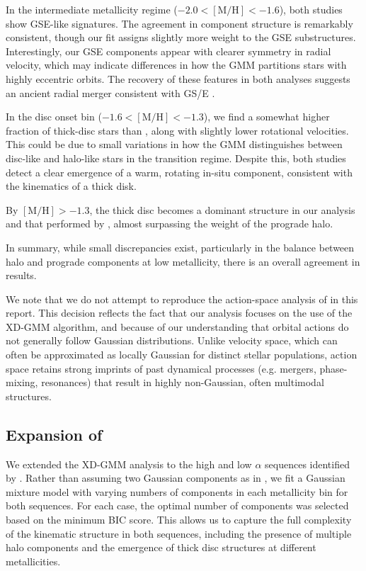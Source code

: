 \documentclass[a4paper,12pt]{article}
\begin{document}
In the intermediate metallicity regime ($-2.0 < \mathrm{[M/H]} < -1.6$), both studies show GSE-like 
signatures. The agreement in component structure is remarkably consistent, though our fit assigns slightly 
more weight to the GSE substructures. Interestingly, our GSE components appear with clearer symmetry in radial 
velocity, which may indicate differences in how the GMM partitions stars with highly eccentric orbits. 
The recovery of these features in both analyses suggests an ancient radial merger consistent with GS/E \citep{Belokurov2020}.

In the disc onset bin ($-1.6 < \mathrm{[M/H]} < -1.3$), we find a somewhat higher fraction of 
thick-disc stars than \citet{zhang2024existencemetalpoordiscmilky}, along with slightly lower rotational 
velocities. This could be due to small variations in how the GMM distinguishes between disc-like and 
halo-like stars in the transition regime. Despite this, both studies detect a clear emergence of a warm, 
rotating in-situ component, consistent with the kinematics of a thick disk.

By $[\mathrm{M/H}] > -1.3$, the thick disc becomes a dominant structure in our analysis and that performed
by \citet{zhang2024existencemetalpoordiscmilky}, almost surpassing the weight of the prograde halo.

In summary, while small discrepancies exist, particularly in the balance between halo and prograde components 
at low metallicity, there is an overall agreement in results.

We note that we do not attempt to reproduce the action-space analysis of \citet{zhang2024existencemetalpoordiscmilky} in this report. 
This decision reflects the fact that our analysis focuses on the use of the XD-GMM algorithm, and because of our
understanding that orbital actions do not generally follow Gaussian distributions. Unlike velocity space, which can often be 
approximated as locally Gaussian for distinct stellar populations, action space retains strong imprints 
of past dynamical processes (e.g. mergers, phase-mixing, resonances) that result in highly non-Gaussian, 
often multimodal structures.



\subsection{Expansion of \citet{Vis2024}}

We extended the XD-GMM analysis to the high and low $\alpha$ sequences identified by \citet{Vis2024}. 
Rather than assuming two Gaussian components as in \citet{Vis2024}, we fit a
Gaussian mixture model with varying numbers of components in each metallicity bin for both sequences. 
For each case, the optimal number of components was selected based on the minimum BIC score.
This allows us to capture the full complexity of the kinematic structure in both sequences,
including the presence of multiple halo components and the emergence of thick disc structures 
at different metallicities.
\end{document}
